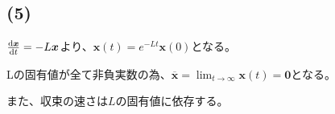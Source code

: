 \documentclass[a4paper, 10pt, dvipdfmx]{jlreq}
\begin{document}
\subsection*{(5)}

$\dv{\bm{x}}{t}=-L\bm{x}$より、$\bm{x}(t)=e^{-Lt}\bm{x}(0)$となる。

Lの固有値が全て非負実数の為、$\bm{\overline{x}}=\lim_{t \to \infty}\bm{x}(t) = \bm{0}$となる。

また、収束の速さは$L$の固有値に依存する。
\end{document}
